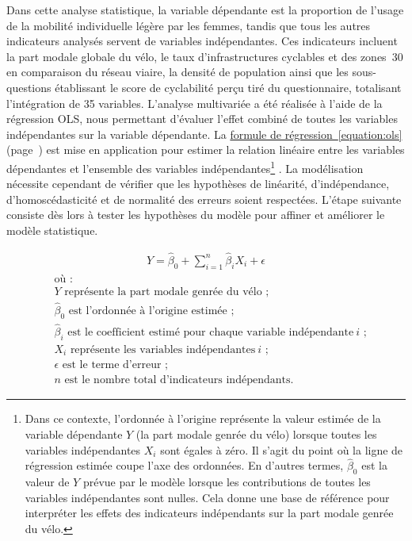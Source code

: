 \begin{refsegment}
Dans cette analyse statistique, la variable dépendante est la proportion de l'usage de la mobilité individuelle légère par les femmes, tandis que tous les autres indicateurs analysés servent de variables indépendantes. Ces indicateurs incluent la part modale globale du vélo, le taux d'infrastructures cyclables et des zones~30 en comparaison du réseau viaire, la densité de population ainsi que les sous-questions établissant le score de cyclabilité perçu tiré du questionnaire, totalisant l'intégration de 35 variables. L'analyse multivariée a été réalisée à l'aide de la régression \acrshort{OLS}, nous permettant d'évaluer l'effet combiné de toutes les variables indépendantes sur la variable dépendante. La \hyperref[equation:ols]{formule de régression~\ref{equation:ols}} (page~\pageref{equation:ols}) est mise en application pour estimer la relation linéaire entre les variables dépendantes et l'ensemble des variables indépendantes\footnote{
    Dans ce contexte, l'ordonnée à l'origine représente la valeur estimée de la variable dépendante \(Y\) (la part modale genrée du vélo) lorsque toutes les variables indépendantes \(X_i\) sont égales à zéro. Il s'agit du point où la ligne de régression estimée coupe l'axe des ordonnées. En d'autres termes, \(\hat{\beta}_0\) est la valeur de \(Y\) prévue par le modèle lorsque les contributions de toutes les variables indépendantes sont nulles. Cela donne une base de référence pour interpréter les effets des indicateurs indépendants sur la part modale genrée du vélo.
    } \textcolor{blue}{\autocite{strang_introduction_1986}}. La modélisation nécessite cependant de vérifier que les hypothèses de linéarité, d'indépendance, d'homoscédasticité et de normalité des erreurs soient respectées. L'étape suivante consiste dès lors à tester les hypothèses du modèle pour affiner et améliorer le modèle statistique.%

\begin{equation}
\label{equation:ols}
\begin{aligned}
Y = \hat{\beta}_0 + \sum_{i=1}^{n} \hat{\beta}_i X_i + \epsilon
\end{aligned}
\end{equation}
\begin{align*}
    &\text{où~:} \\
    &Y \text{ représente la part modale genrée du vélo~;} \\
    &\hat{\beta}_0 \text{ est l'ordonnée à l'origine estimée~;} \\
    &\hat{\beta}_i \text{ est le coefficient estimé pour chaque variable indépendante}~i\text{~;}\\
    &X_i \text{ représente les variables indépendantes}~i\text{~;}\\
    &\epsilon \text{ est le terme d'erreur~;} \\
    &n \text{ est le nombre total d'indicateurs indépendants.}
\end{align*}%


\end{refsegment}
